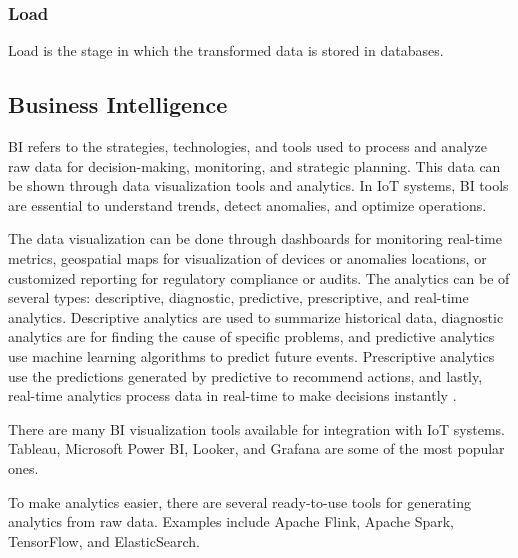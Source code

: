 \subsubsection{Load}
Load is the stage in which the transformed data is stored in databases.

\subsection{Business Intelligence}
\gls{BI} refers to the strategies, technologies, and tools used to process and
analyze raw data for decision-making, monitoring, and strategic planning.
This data can be shown through data visualization tools and analytics.
In \gls{IoT} systems, \gls{BI} tools are essential to understand trends, detect
anomalies, and optimize operations.

The data visualization can be done through dashboards for monitoring real-time
metrics, geospatial maps for visualization of devices or anomalies locations,
or customized reporting for regulatory compliance or audits. The analytics can
be of several types: descriptive, diagnostic, predictive, prescriptive, and
real-time analytics. Descriptive analytics are used to summarize historical
data, diagnostic analytics are for finding the cause of specific problems, and
predictive analytics use machine learning algorithms to predict future events.
Prescriptive analytics use the predictions generated by predictive to recommend
actions, and lastly, real-time analytics process data in real-time to make
decisions instantly \cite{Adi2020}.

There are many \gls{BI} visualization tools available for integration with \gls{IoT} systems.
Tableau, Microsoft Power BI, Looker, and Grafana are some of the most popular ones.

To make analytics easier, there are several ready-to-use tools for generating
analytics from raw data. Examples include Apache Flink, Apache Spark,
TensorFlow, and ElasticSearch.





